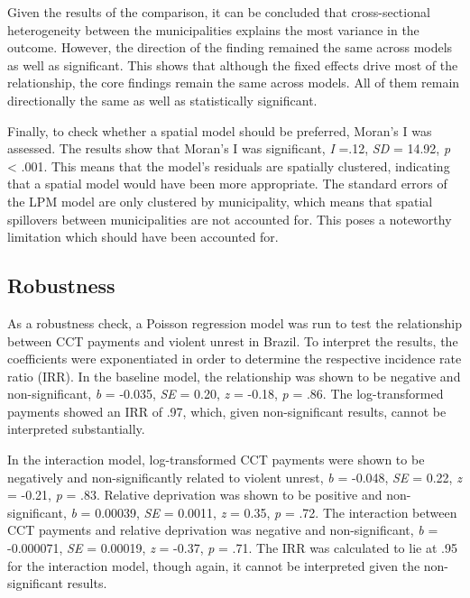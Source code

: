 \documentclass[stu,12pt]{apa7}
\begin{document}
Given the results of the comparison, it can be concluded that cross-sectional heterogeneity between the municipalities explains the most variance in the outcome. However, the direction of the finding remained the same across models as well as significant. This shows that although the fixed effects drive most of the relationship, the core findings remain the same across models. All of them remain directionally the same as well as statistically significant.

Finally, to check whether a spatial model should be preferred, Moran’s I was assessed. The results show that Moran’s I was significant, \textit{I} =.12, \textit{SD} = 14.92, \textit{p} < .001. This means that the model’s residuals are spatially clustered, indicating that a spatial model would have been more appropriate. The standard errors of the LPM model are only clustered by municipality, which means that spatial spillovers between municipalities are not accounted for. This poses a noteworthy limitation which should have been accounted for.

\subsection{Robustness}

As a robustness check, a Poisson regression model was run to test the relationship between CCT payments and violent unrest in Brazil. To interpret the results, the coefficients were exponentiated in order to determine the respective incidence rate ratio (IRR). In the baseline model, the relationship was shown to be negative and non-significant, \textit{b} = -0.035, \textit{SE} = 0.20, \textit{z} = -0.18, \textit{p} = .86. The log-transformed payments showed an IRR of .97, which, given non-significant results, cannot be interpreted substantially.

In the interaction model, log-transformed CCT payments were shown to be negatively and non-significantly related to violent unrest, \textit{b} = -0.048, \textit{SE} = 0.22, \textit{z} = -0.21, \textit{p} = .83. Relative deprivation was shown to be positive and non-significant, \textit{b} = 0.00039, \textit{SE} = 0.0011, \textit{z} = 0.35, \textit{p} = .72. The interaction between CCT payments and relative deprivation was negative and non-significant, \textit{b} = -0.000071, \textit{SE} = 0.00019, \textit{z} = -0.37, \textit{p} = .71. The IRR was calculated to lie at .95 for the interaction model, though again, it cannot be interpreted given the non-significant results.
\end{document}
